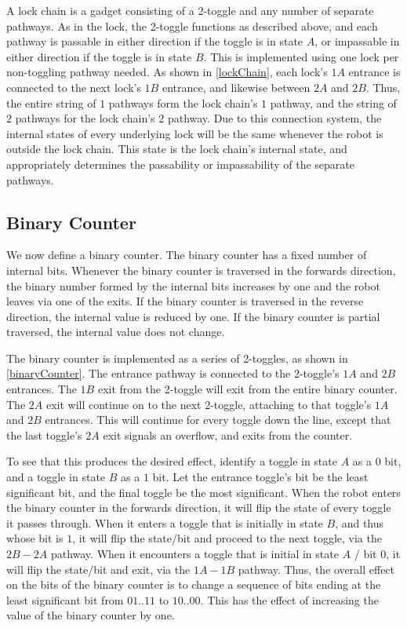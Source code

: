 \documentclass[11pt]{article}
\begin{document}
A lock chain is a gadget consisting of a 2-toggle and any number of separate pathways. As in the
lock, the 2-toggle functions as described above, and each pathway is passable in either direction
if the toggle is in state $A$, or impassable in either direction if the toggle is in state $B$. This is
implemented using one lock per non-toggling pathway needed. As shown in \ref{lockChain}, each lock’s $1A$
entrance is connected to the next lock’s $1B$ entrance, and likewise between $2A$ and $2B$. Thus, the
entire string of $1$ pathways form the lock chain’s $1$ pathway, and the string of $2$ pathways for the
lock chain’s $2$ pathway. Due to this connection system, the internal states of every underlying lock
will be the same whenever the robot is outside the lock chain. This state is the lock chain’s internal
state, and appropriately determines the passability or impassability of the separate pathways.

\subsection{Binary Counter}
We now define a binary counter. The binary counter has a fixed number of internal bits.
Whenever the binary counter is traversed in the forwards direction, the binary number
formed by the internal bits increases by one and the robot leaves via one of the exits.
If the binary counter is traversed in the reverse direction, the internal value is reduced by
one. If the binary counter is partial traversed, the internal value does not change.

The binary counter is implemented as a series of 2-toggles, as shown in \ref{binaryCounter}.
The entrance pathway is connected to the 2-toggle's $1A$ and $2B$ entrances. The $1B$ exit from the 2-toggle
will exit from the entire binary counter. The $2A$ exit will continue on to the next 2-toggle,
attaching to that toggle's $1A$ and $2B$ entrances. This will continue for every toggle down the line, except
that the last toggle's $2A$ exit signals an overflow, and exits from the counter.

To see that this produces the desired effect, identify a toggle in state $A$ as a $0$ bit, and a toggle in state
$B$ as a $1$ bit. Let the entrance toggle's bit be the least significant bit, and the final toggle be the
most significant. When the robot enters the binary counter in the forwards direction, it will flip
the state of every toggle it passes through. When it enters a toggle that is initially in state $B$, and thus whose
bit is $1$, it will flip the state/bit and proceed to the next toggle, via the $2B - 2A$ pathway. When it
encounters a toggle that is initial in state $A$ / bit $0$, it will flip the state/bit and exit, via the $1A - 1B$
pathway. Thus, the overall effect on the bits of the binary counter is to change a sequence of bits ending at the
least significant bit from $01..11$ to $10..00$. This has the effect of increasing the value of the binary counter
by one.
\end{document}
